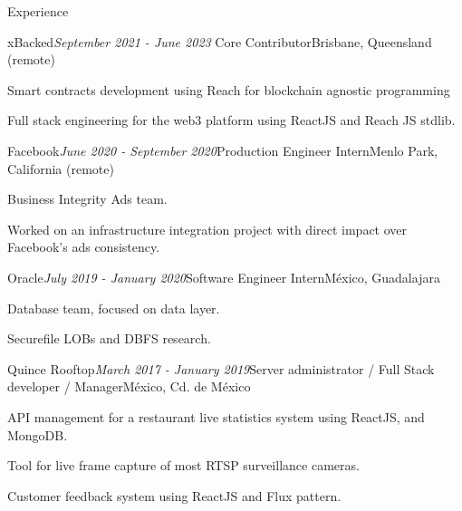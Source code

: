 \documentclass{resume} %
\begin{document}
\begin{rSection}{Experience}

\begin{rSubsection}{xBacked}{\em September 2021 - June 2023}
{Core Contributor}{Brisbane, Queensland (remote)}
\item Smart contracts development using Reach for blockchain agnostic programming
\item Full stack engineering for the web3 platform using ReactJS and Reach JS stdlib.
\end{rSubsection}

\begin{rSubsection}{Facebook}{\em June 2020 - September 2020}{Production Engineer Intern}{Menlo Park, California (remote)}
\item Business Integrity Ads team.
\item Worked on an infrastructure integration project with direct impact over Facebook's ads consistency.
\end{rSubsection}

\begin{rSubsection}{Oracle}{\em July 2019 - January 2020}{Software Engineer Intern}{México, Guadalajara}
\item Database team, focused on data layer.
\item Securefile LOBs and DBFS research.
\end{rSubsection}

\begin{rSubsection}{Quince Rooftop}{\em March 2017 - January 2019}{Server administrator / Full Stack developer / Manager}{México, Cd. de México}
\item API management for a restaurant live statistics system using ReactJS, and MongoDB.
\item Tool for live frame capture of most RTSP surveillance cameras.
\item Customer feedback system using ReactJS and Flux pattern.
\end{rSubsection}


\end{rSection}
\end{document}
